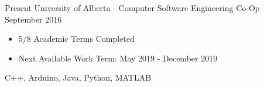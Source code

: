 
  

\begin{experiences}
    \experience
      {Present}   {University of Alberta - Computer Software Engineering Co-Op}{}{}
      {September 2016} {
                        \begin{itemize}
                          \item 5/8 Academic Terms Completed
                          \item Next Available Work Term: May 2019 - December 2019
                        \end{itemize}
                      }
                      {
                        C++,
                        Arduino,
                        Java,
                        Python,
                        MATLAB
                      }
  
  \end{experiences}